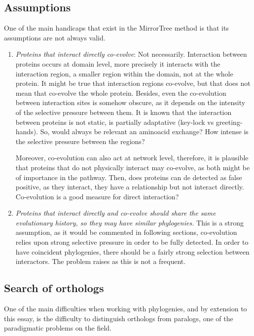 \documentclass[11pt]{article}
\begin{document}
\subsection{Assumptions}
One of the main handicaps that exist in the MirrorTree method is that its assumptions are not always valid.
\begin{enumerate}
\setlength{\itemsep}{1pt}
	\item \textit{Proteins that interact directly co-evolve}: Not necessarily. Interaction between proteins 		occurs at domain level, more precisely it interacts with the interaction region, a smaller region within 		the domain, not at the whole protein. It might be true that interaction regions co-evolve, but that does 		not mean that co-evolve the whole protein. Besides, even the co-evolution between interaction sites is 		somehow obscure, as it depends on the intensity of the selective pressure between them. It is known that 		the interaction between proteins is not static, is partially adaptative (key-lock vs greeting-hands). So, 	would always be relevant an aminoacid exchange? How intense is the selective pressure between the 			regions?

	Moreover, co-evolution can also act at network level, therefore, it is plausible that proteins that do 		not physically interact may co-evolve, as both might be of importance in the pathway. Then, does proteins 	can de detected as false positive, as they interact, they have a relationship but not interact directly. 		Co-evolution is a good measure for direct interaction?

	\item \textit{Proteins that interact directly and co-evolve should share the same evolutionary history, 		so they may have similar phylogenies.} This is a strong assumption, as it would be commented in following		sections, co-evolution relies upon strong selective pressure in order to be fully detected. In order to 		have coincident phylogenies, there should be a fairly strong selection between interactors. The problem 		raises as this is not a frequent.
\end{enumerate}

\subsection{Search of orthologs}
One of the main difficulties when working with phylogenies, and by extension to this essay, is the difficulty to distinguish orthologs from paralogs, one of the paradigmatic problems on the field. 
\end{document}
